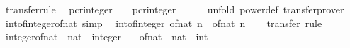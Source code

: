 \begin{isabellebody}
%
\endisadelimproof
\isanewline
{}\isamarkupfalse%
\ {\isacharbrackleft}{\kern0pt}transfer{\isacharunderscore}{\kern0pt}rule{\isacharbrackright}{\kern0pt}{\isacharcolon}{\kern0pt}\isanewline
\ \ {\isachardoublequoteopen}{\isacharparenleft}{\kern0pt}pcr{\isacharunderscore}{\kern0pt}integer\ {\isacharequal}{\kern0pt}{\isacharequal}{\kern0pt}{\isacharequal}{\kern0pt}{\isachargreater}{\kern0pt}\ {\isacharparenleft}{\kern0pt}{\isacharequal}{\kern0pt}{\isacharparenright}{\kern0pt}\ {\isacharequal}{\kern0pt}{\isacharequal}{\kern0pt}{\isacharequal}{\kern0pt}{\isachargreater}{\kern0pt}\ pcr{\isacharunderscore}{\kern0pt}integer{\isacharparenright}{\kern0pt}\ {\isacharparenleft}{\kern0pt}{\isacharcircum}{\kern0pt}{\isacharparenright}{\kern0pt}\ {\isacharparenleft}{\kern0pt}{\isacharcircum}{\kern0pt}{\isacharparenright}{\kern0pt}{\isachardoublequoteclose}\isanewline
%
\isadelimproof
\ \ %
\endisadelimproof
%
\isatagproof
{}\isamarkupfalse%
\ {\isacharparenleft}{\kern0pt}unfold\ power{\isacharunderscore}{\kern0pt}def{\isacharparenright}{\kern0pt}\ transfer{\isacharunderscore}{\kern0pt}prover%
\endisatagproof
{\isafoldproof}%
%
\isadelimproof
\isanewline
%
\endisadelimproof
\isanewline
{}\isamarkupfalse%
\isanewline
\isanewline
{}\isamarkupfalse%
\ int{\isacharunderscore}{\kern0pt}of{\isacharunderscore}{\kern0pt}integer{\isacharunderscore}{\kern0pt}of{\isacharunderscore}{\kern0pt}nat\ {\isacharbrackleft}{\kern0pt}simp{\isacharbrackright}{\kern0pt}{\isacharcolon}{\kern0pt}\isanewline
\ \ {\isachardoublequoteopen}int{\isacharunderscore}{\kern0pt}of{\isacharunderscore}{\kern0pt}integer\ {\isacharparenleft}{\kern0pt}of{\isacharunderscore}{\kern0pt}nat\ n{\isacharparenright}{\kern0pt}\ {\isacharequal}{\kern0pt}\ of{\isacharunderscore}{\kern0pt}nat\ n{\isachardoublequoteclose}\isanewline
%
\isadelimproof
\ \ %
\endisadelimproof
%
\isatagproof
{}\isamarkupfalse%
\ transfer\ rule%
\endisatagproof
{\isafoldproof}%
%
\isadelimproof
\isanewline
%
\endisadelimproof
\isanewline
{}\isamarkupfalse%
\ integer{\isacharunderscore}{\kern0pt}of{\isacharunderscore}{\kern0pt}nat\ {\isacharcolon}{\kern0pt}{\isacharcolon}{\kern0pt}\ {\isachardoublequoteopen}nat\ {\isasymRightarrow}\ integer{\isachardoublequoteclose}\isanewline
\ \ \ {\isachardoublequoteopen}of{\isacharunderscore}{\kern0pt}nat\ {\isacharcolon}{\kern0pt}{\isacharcolon}{\kern0pt}\ nat\ {\isasymRightarrow}\ int{\isachardoublequoteclose}\isanewline
%
\isadelimproof
\ \ %
\endisadelimproof
%

\end{isabellebody}
